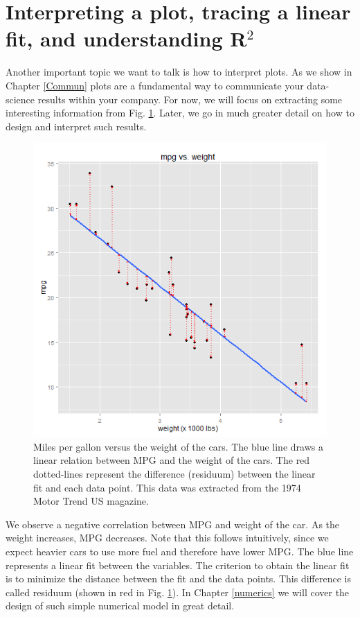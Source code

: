 \documentclass[10pt]{PhDthesisPSnPDF}%
\begin{document}
\section{Interpreting a plot, tracing a linear fit, and understanding R$^2$}

Another important topic we want to talk is how to interpret plots. As we show in Chapter \ref{Commun} plots are a fundamental way to communicate your data-science results within your company. For now, we will focus on extracting some interesting information from Fig. \ref{fig:linR}. Later, we go in much greater detail on how to design and interpret such results.

\begin{figure}[h]
	\begin{center}
			\includegraphics[scale=0.35]{linregch2}
	\end{center}
	\caption{Miles per gallon versus the weight of the cars. The blue line draws a linear relation between MPG and the weight of the cars. The red dotted-lines represent the difference (residuum) between the linear fit and each data point. This data was extracted from the 1974 Motor Trend US magazine.}
	\label{fig:linR}
\end{figure} 

We observe a negative correlation between MPG and weight of the car. As the weight increases, MPG decreases. Note that this follows intuitively, since we expect heavier cars to use more fuel and therefore have lower MPG. The blue line represents a linear fit between the variables. The criterion to obtain the linear fit is to minimize the distance between the fit and the data points. This difference is called residuum (shown in red in Fig. \ref{fig:linR}). In Chapter \ref{numerics} we will cover the design of such simple numerical model in great detail. 
\end{document}
